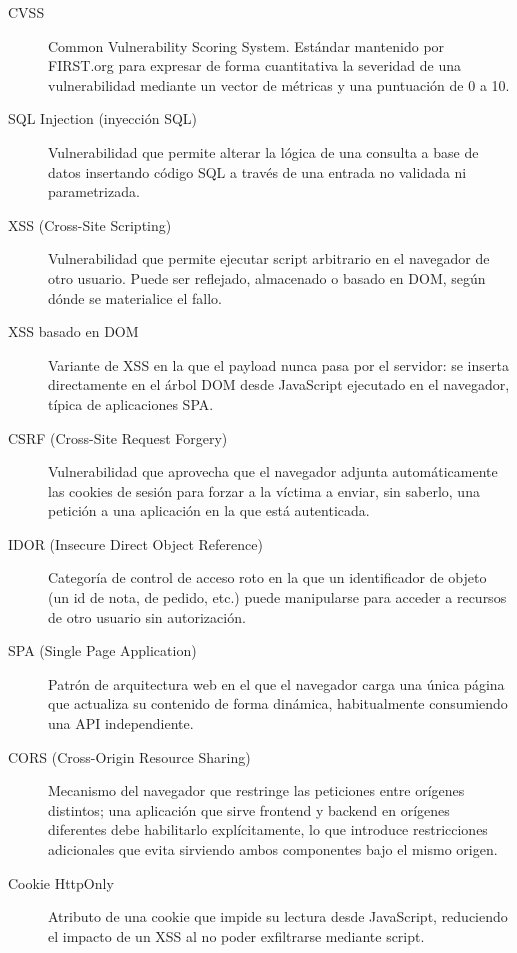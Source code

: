 \begin{description}
\item[CVSS] Common Vulnerability Scoring System. Estándar mantenido por
  FIRST.org para expresar de forma cuantitativa la severidad de una
  vulnerabilidad mediante un vector de métricas y una puntuación de 0 a 10.

\item[SQL Injection (inyección SQL)] Vulnerabilidad que permite alterar la
  lógica de una consulta a base de datos insertando código SQL a través de
  una entrada no validada ni parametrizada.

\item[XSS (Cross-Site Scripting)] Vulnerabilidad que permite ejecutar
  script arbitrario en el navegador de otro usuario. Puede ser reflejado,
  almacenado o basado en DOM, según dónde se materialice el fallo.

\item[XSS basado en DOM] Variante de XSS en la que el payload nunca pasa por
  el servidor: se inserta directamente en el árbol DOM desde JavaScript
  ejecutado en el navegador, típica de aplicaciones SPA.

\item[CSRF (Cross-Site Request Forgery)] Vulnerabilidad que aprovecha que el
  navegador adjunta automáticamente las cookies de sesión para forzar a la
  víctima a enviar, sin saberlo, una petición a una aplicación en la que
  está autenticada.

\item[IDOR (Insecure Direct Object Reference)] Categoría de control de
  acceso roto en la que un identificador de objeto (un id de nota, de
  pedido, etc.) puede manipularse para acceder a recursos de otro usuario
  sin autorización.

\item[SPA (Single Page Application)] Patrón de arquitectura web en el que
  el navegador carga una única página que actualiza su contenido de forma
  dinámica, habitualmente consumiendo una API independiente.

\item[CORS (Cross-Origin Resource Sharing)] Mecanismo del navegador que
  restringe las peticiones entre orígenes distintos; una
  aplicación que sirve frontend y backend en orígenes diferentes debe
  habilitarlo explícitamente, lo que introduce restricciones adicionales
  que \breachlab evita sirviendo ambos componentes bajo el mismo origen.

\item[Cookie HttpOnly] Atributo de una cookie que impide su lectura desde
  JavaScript, reduciendo el impacto de un XSS al no poder exfiltrarse
  mediante script.


\end{description}
